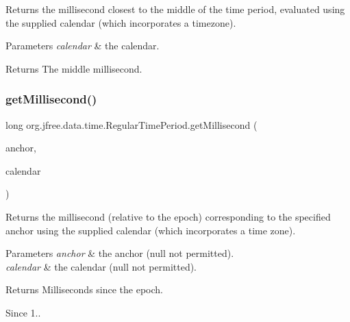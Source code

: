 Returns the millisecond closest to the middle of the time period, evaluated using the supplied calendar (which incorporates a timezone).


\begin{DoxyParams}{Parameters}
{\em calendar} & the calendar.\\
\hline
\end{DoxyParams}
\begin{DoxyReturn}{Returns}
The middle millisecond. 
\end{DoxyReturn}
\mbox{\label{classorg_1_1jfree_1_1data_1_1time_1_1_regular_time_period_a7e6e62d87f8ea991c50764f00a6b65e8}} 
\subsubsection{\texorpdfstring{get\+Millisecond()}{getMillisecond()}}
{\footnotesize\ttfamily long org.\+jfree.\+data.\+time.\+Regular\+Time\+Period.\+get\+Millisecond (\begin{DoxyParamCaption}\item[{\mbox{\hyperlink{classorg_1_1jfree_1_1data_1_1time_1_1_time_period_anchor}{Time\+Period\+Anchor}}}]{anchor,  }\item[{Calendar}]{calendar }\end{DoxyParamCaption})}

Returns the millisecond (relative to the epoch) corresponding to the specified {\ttfamily anchor} using the supplied {\ttfamily calendar} (which incorporates a time zone).


\begin{DoxyParams}{Parameters}
{\em anchor} & the anchor ({\ttfamily null} not permitted). \\
\hline
{\em calendar} & the calendar ({\ttfamily null} not permitted).\\
\hline
\end{DoxyParams}
\begin{DoxyReturn}{Returns}
Milliseconds since the epoch.
\end{DoxyReturn}
\begin{DoxySince}{Since}
1.. 
\end{DoxySince}
\mbox{\label{classorg_1_1jfree_1_1data_1_1time_1_1_regular_time_period_abe01895fe40608e97cc2ac2c97e8ca57}} 
